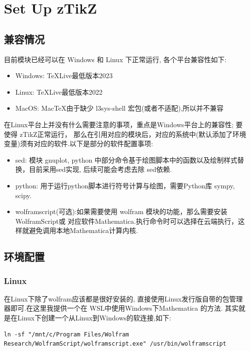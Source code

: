 \section{Set Up zTikZ}
\subsection{兼容情况}
目前模块已经可以在 Windows 和 Linux 下正常运行, 各个平台兼容性如下:

\hspace*{10em}\parbox{8cm}{
\begin{itemize}
  \item Windows: \TeX{}Live最低版本2023
  \item Linux: \TeX{}Live最低版本2022
  \item MacOS: Mac\TeX{}由于缺少 {l3sys-shell} 宏包(或者不适配),所以并不兼容
\end{itemize}}

在Linux平台上并没有什么需要注意的事项，重点是Windows平台上的兼容性; 要使得 {zTikZ}正常运行，
那么在引用对应的模块后，对应的系统中(默认添加了环境变量)须有对应的软件.以下是部分的软件配置事项:
\begin{itemize}
  \item {sed}: 模块 gnuplot, python 中部分命令基于绘图脚本中的函数以及绘制样式替换，目前采用sed实现,
    后续可能会考虑去除 {sed}依赖.
  \item {python}: 用于运行python脚本进行符号计算与绘图，需要Python库 {sympy, scipy}.
  \item {wolframscript}(可选):如果需要使用 wolfram 模块的功能，那么需要安装WolframScript或
      对应软件Mathematica.执行命令时可以选择在云端执行，这样就避免调用本地Mathematica计算内核. 
\end{itemize}

\subsection{环境配置}
\subsubsection{Linux}
在Linux下除了wolfram应该都是很好安装的, 直接使用Linux发行版自带的包管理器即可.在这里我提供一个在
WSL中使用Windows下Mathematica 的方法. 其实就是在Linux下创建一个从Linux到Windows的软连接,如下:

\begin{verbatim}
ln -sf "/mnt/c/Program Files/Wolfram Research/WolframScript/wolframscript.exe" /usr/bin/wolframscript    
\end{verbatim}

